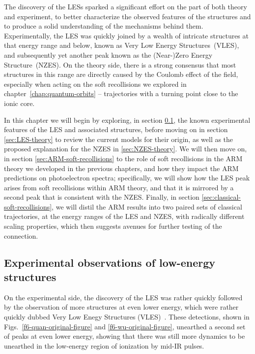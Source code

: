 The discovery of the LESs sparked a significant effort on the part of both theory and experiment, to better characterize the observed features of the structures and to produce a solid understanding of the mechanisms behind them. Experimentally, the LES was quickly joined by a wealth of intricate structures at that energy range and below, known as Very Low Energy Structures~(VLES), and subsequently yet another peak known as the \mbox{(Near-)Zero} Energy Structure~(NZES). On the theory side, there is a strong consensus that most structures in this range are directly caused by the Coulomb effect of the field, especially when acting on the soft recollisions we explored in chapter~\ref{chap:quantum-orbits} -- trajectories with a turning point close to the ionic core.

In this chapter we will begin by exploring, in section \ref{sec:LES-experiment}, the known experimental features of the LES and associated structures, before moving on in section \ref{sec:LES-theory} to review the current models for their origin, as well as the proposed explanation for the NZES in \ref{sec:NZES-theory}. We will then move on, in section \ref{sec:ARM-soft-recollisions} to the role of soft recollisions in the ARM theory we developed in the previous chapters, and how they impact the ARM predictions on photoelectron spectra; specifically, we will show how the LES peak arises from soft recollisions within ARM theory, and that it is mirrored by a second peak that is consistent with the NZES. Finally, in section \ref{sec:classical-soft-recollisions}, we will distil the ARM results into two paired sets of classical trajectories, at the energy ranges of the LES and NZES, with radically different scaling properties, which then suggests avenues for further testing of the connection.



\subsection{Experimental observations of low-energy structures}
\label{sec:LES-experiment}

On the experimental side, the discovery of the LES was rather quickly followed by the observation of more structures at even lower energy, which were rather quickly dubbed Very Low Enegy Structures (VLES)~\cite{VLES_initial, VLES_characterization}. These detections, shown in Figs.~\ref{f6-quan-original-figure} and \ref{f6-wu-original-figure}, unearthed a second set of peaks at even lower energy, showing that there was still more dynamics to be unearthed in the low-energy region of ionization by mid-IR pulses. 


